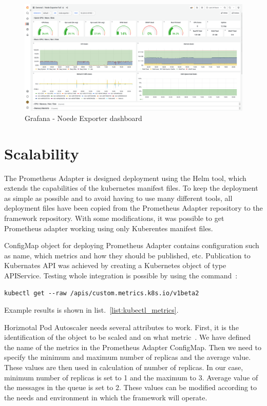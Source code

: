 \begin{figure}[H]
    \centering
    \includegraphics[width=\linewidth]{other-fig/grafana.png}
    \caption{Grafana - Noede Exporter dashboard}
    \label{fig:grafana_node_exporter}
\end{figure}


\section{Scalability}
\label{section:scalability}

The Prometheus Adapter is designed deployment using the Helm tool, which extends the capabilities of the kubernetes manifest files. To keep the deployment as simple as possible and to avoid having to use many different tools, all deployment files have been copied from the Prometheus Adapter repository to the framework repository. With some modifications, it was possible to get Prometheus adapter working using only Kuberentes manifest files.

ConfigMap object for deploying Prometheus Adapter contains configuration such as name, which metrics and how they should be published, etc. Publication to Kubernates API was achieved by creating a Kubernetes object of type APIService. Testing whole integration is possible by using the command~\cite{PrometheusAdapter}: 

\begin{lstlisting}
kubectl get --raw /apis/custom.metrics.k8s.io/v1beta2 
\end{lstlisting}

\noindent Example results is shown in list.~\ref{list:kubectl_metrics}.

Horiznotal Pod Autoscaler needs several attributes to work. First, it is the identification of the object to be scaled and on what metric~\cite{HorizontalPodAutoscaler}. We have defined the name of the metrics in the Prometheus Adapter ConfigMap. Then we need to specify the minimum and maximum number of replicas and the average value. These values are then used in calculation of number of replicas. In our case, minimum number of replicas is set to 1 and the maximum to 3. Average value of the messages in the queue is set to 2. These values can be modified according to the needs and environment in which the framework will operate.~\cite{HorizontalPodAutoscaler}

